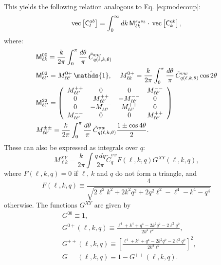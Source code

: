\documentclass[usenatbib]{mnrasb}
\newcommand{\mI}{{\mathds{1}}}
\begin{document}
    This yields the following relation analogous to Eq. \ref{eq:modecoup}:
    \begin{equation}
      {\rm vec}\left[{\sf C}^{ab}_l\right]=\int_0^{\infty} dk\, {\sf M}^{s_as_b}_{\ell k}\cdot\,{\rm vec}\left[{\sf C}^{ab}_k\right],
    \end{equation}
    where:
    \begin{align}
      &{\sf M}^{00}_{\ell k}=\frac{k}{2\pi}\int_0^\pi \frac{d\theta}{\pi}\,\tilde{C}^{vw}_{q(\ell,k,\theta)}\\
      &{\sf M}^{02}_{\ell\ell'}=M^{0+}_{\ell\ell'}\,\hat\mI,
      \hspace{12pt}
      M^{0+}_{\ell k}=\frac{k}{2\pi}\int_0^\pi \frac{d\theta}{\pi}\,\tilde{C}^{vw}_{q(\ell,k,\theta)}\cos2\theta\\
      &{\sf M}^{22}_{\ell\ell'}=\left(
      \begin{array}{cccc}
        M^{++}_{\ell\ell'} &0 &0&M^{--}_{\ell\ell'}\\
        0&M^{++}_{\ell\ell'} &-M^{--}_{\ell\ell'}&0\\
        0&-M^{--}_{\ell\ell'} &M^{++}_{\ell\ell'}&0\\
        M^{--}_{\ell\ell'} &0 &0&M^{++}_{\ell\ell'}
      \end{array}\right)\\
      &M^{\pm\pm}_{\ell\ell'}=\frac{k}{2\pi}\int_0^\pi \frac{d\theta}{\pi}\,\tilde{C}^{vw}_{q(\ell,k,\theta)}\frac{1\pm\cos4\theta}{2}.
    \end{align}
    These can also be expressed as integrals over $q$:
    \begin{equation}
      M^{XY}_{\ell k}=\frac{k}{2\pi}\int\frac{q\,dq}{2\pi}\tilde{C}^{vw}_qF(\ell,k,q)G^{XY}(\ell,k,q),
    \end{equation}
    where $F(\ell,k,q)=0$ if $\ell$, $k$ and $q$ do not form a triangle, and
    \begin{equation}\nonumber
      F(\ell,k,q)\equiv\frac{4}{\sqrt{2\ell^2k^2+2k^2q^2+2q^2\ell^2-\ell^4-k^4-q^4}}
    \end{equation}
    otherwise. The functions $G^{XY}$ are given by
    \begin{align}
      &G^{00}\equiv1,\\
      &G^{0+}(\ell,k,q)\equiv\frac{\ell^4+k^4+q^4-2k^2q^2-2\ell^2q^2}{2k^2\ell^2},\\
      &G^{++}(\ell,k,q)\equiv\left[\frac{\ell^4+k^4+q^4-2k^2q^2-2\ell^2q^2}{2k^2\ell^2}\right]^2,\\
      &G^{--}(\ell,k,q)\equiv1-G^{++}(\ell,k,q).
    \end{align}
    
\end{document}
